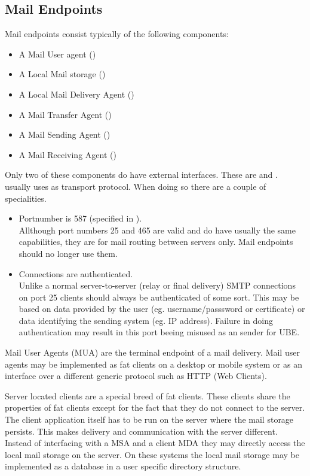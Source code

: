 \subsection{Mail Endpoints}
Mail endpoints consist typically of the following components:
\begin{itemize}
	\item A Mail User agent ()
	\item A Local Mail storage ()
	\item A Local Mail Delivery Agent ()
	\item A Mail Transfer Agent ()
	\item A Mail Sending Agent ()
	\item A Mail Receiving Agent ()
\end{itemize}

Only two of these components do have external interfaces. These are  and .  usually uses  as transport protocol. When doing so there are a couple of specialities. 
\begin{itemize}
	\item Portnumber is 587 (specified in \cite{RFC4409}).\\
	Allthough port numbers 25 and 465 are valid and do have usually the same capabilities, they are for mail routing between servers only. Mail endpoints should no longer use them.
	\item Connections are authenticated.\\
	Unlike a normal server-to-server (relay or final delivery) SMTP connections on port 25 clients should always be authenticated of some sort. This may be based on data provided by the user (eg. username/passsword or certificate) or data identifying the sending system (eg. IP address)\cite{RFC4409}. Failure in doing authentication may result in this port beeing misused as an sender for UBE.
\end{itemize}

Mail User Agents (MUA) are the terminal endpoint of a mail delivery. Mail user agents may be implemented as fat clients on a desktop or mobile system or as an interface over a different generic protocol such as HTTP (Web Clients). \par

Server located clients are a special breed of fat clients. These clients share the properties of fat clients except for the fact that they do not connect to the server. The client application itself has to be run on the server where the mail storage persists. This makes delivery and communication with the server different. Instead of interfacing with a MSA and a client MDA they may directly access the local mail storage on the server. On these systems the local mail storage may be implemented as a database in a user specific directory structure.

